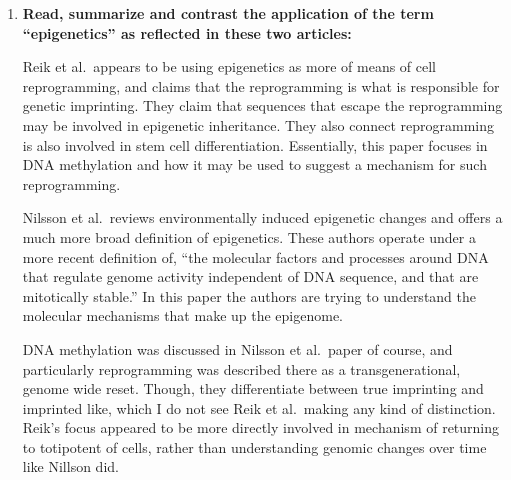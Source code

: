 \documentclass[basic]{inVerba-notes}
\begin{document}
\begin{enumerate}
    \item \textbf{Read, summarize and contrast the application of the term “epigenetics” as reflected in these two articles:}
    

    Reik et al.\ appears to be using epigenetics as more of means of cell reprogramming, and claims that the reprogramming is what is responsible for genetic imprinting. They claim that sequences that escape the reprogramming may be involved in epigenetic inheritance. They also connect reprogramming is also involved in stem cell differentiation. Essentially, this paper focuses in DNA methylation and how it may be used to suggest a mechanism for such reprogramming. 

    Nilsson et al.\ reviews environmentally induced epigenetic changes and offers a much more broad definition of epigenetics. These authors operate under a more recent definition of, ``the molecular factors and processes around DNA that regulate genome activity independent of DNA sequence, and that are mitotically stable.'' In this paper the authors are trying to understand the molecular mechanisms that make up the epigenome.

    DNA methylation was discussed in Nilsson et al.\ paper of course, and particularly reprogramming was described there as a transgenerational, genome wide reset. Though, they differentiate between true imprinting and imprinted like, which I do not see Reik et al.\ making any kind of distinction. Reik's focus appeared to be more directly involved in mechanism of returning to totipotent of cells, rather than understanding genomic changes over time like Nillson did. 




  \end{enumerate}
\end{document}
